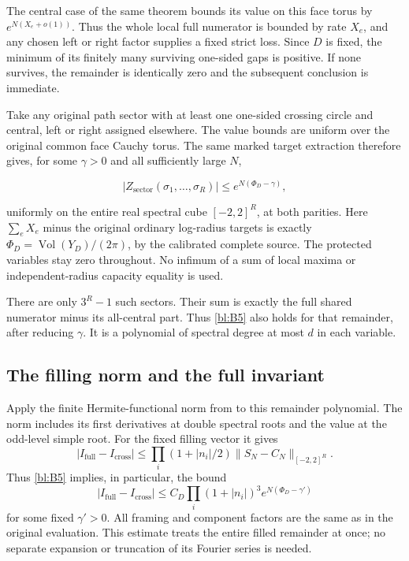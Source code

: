 The central case of the same theorem bounds its value on this face
torus by \(e^{N(X_e+o(1))}\). Thus the whole local full numerator is bounded by rate \(X_e\), and any chosen left or right factor supplies a fixed strict loss. Since \(D\) is fixed, the minimum of its finitely many surviving one-sided gaps is positive. If none survives, the remainder is identically zero and the subsequent conclusion is immediate.

Take any original path sector with at least one one-sided crossing circle and central, left or right assigned elsewhere. The value bounds are uniform over the original common face Cauchy torus. The same marked target extraction therefore gives, for some \(\gamma>0\) and all sufficiently large \(N\),

\begin{equation}\label{bl:B5}
|Z_{\mathrm{sector}}(\sigma_1,\ldots,\sigma_R)|
\leq e^{N(\Phi_D-\gamma)},
\end{equation}

uniformly on the entire real spectral cube \([-2,2]^R\), at both parities. Here \(\sum_eX_e\) minus the original ordinary log-radius targets is exactly \(\Phi_D=\operatorname{Vol}(Y_D)/(2\pi)\), by the calibrated complete source. The protected variables stay zero throughout. No infimum of a sum of local maxima or independent-radius capacity equality is used.

There are only \(3^R-1\) such sectors. Their sum is exactly the full shared numerator minus its all-central part. Thus \eqref{bl:B5} also holds for that remainder, after reducing \(\gamma\). It is a polynomial of spectral degree at most $d$ in each variable.

\subsection{The filling norm and the full invariant}\label{bl:entire-original-fourier-remainder-and-the-full-invariant}

Apply the finite Hermite-functional norm from
\cite[Theorem~1.1]{Finite} to this remainder polynomial. The norm
includes its first derivatives at double spectral roots and the value
at the odd-level simple root. For the fixed filling vector it gives
\[
 |I_{\mathrm{full}}-I_{\mathrm{cross}}|
 \le \prod_i(1+|n_i|/2)
       \|S_N-C_N\|_{[-2,2]^R}.
\]
Thus \eqref{bl:B5} implies, in particular, the bound
\begin{equation}\label{bl:B6}
 |I_{\mathrm{full}}-I_{\mathrm{cross}}|
 \le C_D\prod_i(1+|n_i|)^3e^{N(\Phi_D-\gamma')}
\end{equation}
for some fixed $\gamma'>0$. All framing and component factors are
the same as in the original evaluation. This estimate treats the
entire filled remainder at once; no separate expansion or truncation
of its Fourier series is needed.

